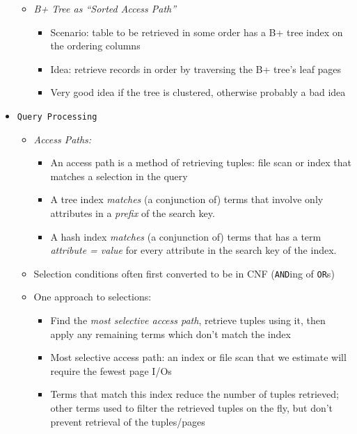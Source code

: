 \documentclass[landscape,8pt]{extarticle}
\newcommand{\code}{\lstinline}
\begin{document}
\begin{multicols}{5}
\begin{itemize}
\begin{itemize}
\begin{itemize}
                        \end{itemize}
                  \item \emph{B+ Tree as ``Sorted Access Path''}
                        \begin{itemize}
                            \item Scenario: table to be retrieved in some order has a B+ tree index on the ordering columns
                            \item Idea: retrieve records in order by traversing the B+ tree's leaf pages
                            \item Very good idea if the tree is clustered, otherwise probably a bad idea
                        \end{itemize}
              \end{itemize}
        \item \code{Query Processing}
              \begin{itemize}
                  \item \emph{Access Paths:}
                        \begin{itemize}
                            \item An access path is a method of retrieving tuples: file scan or index that matches a selection in the query
                            \item A tree index \emph{matches} (a conjunction of) terms that involve only attributes in a \emph{prefix} of the search key.
                            \item A hash index \emph{matches} (a conjunction of) terms that has a term \emph{attribute = value} for every attribute in the search key of the index.
                        \end{itemize}
                  \item Selection conditions often first converted to be in CNF (\code{AND}ing of \code{OR}s)
                  \item One approach to selections:
                        \begin{itemize}
                            \item Find the \emph{most selective access path}, retrieve tuples using it, then apply any remaining terms which don't match the index
                            \item Most selective access path: an index or file scan that we estimate will require the fewest page I/Os
                            \item Terms that match this index reduce the number of tuples retrieved; other terms used to filter the retrieved tuples on the fly, but don't prevent retrieval of the tuples/pages

\end{itemize}
\end{itemize}
\end{itemize}
\end{multicols}
\end{document}
